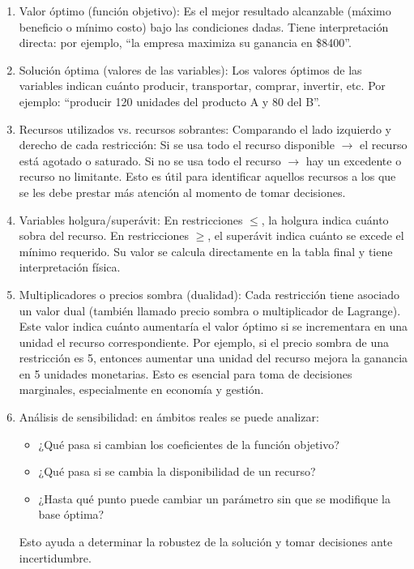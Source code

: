 \begin{enumerate}
  \item Valor óptimo (función objetivo): Es el mejor resultado alcanzable (máximo beneficio o mínimo costo) bajo las condiciones dadas. Tiene interpretación directa: por ejemplo, ``la empresa maximiza su ganancia en \$8400''.
  
  \item Solución óptima (valores de las variables): Los valores óptimos de las variables indican cuánto producir, transportar, comprar, invertir, etc. Por ejemplo: ``producir 120 unidades del producto A y 80 del B''.
  
  \item Recursos utilizados vs. recursos sobrantes: Comparando el lado izquierdo y derecho de cada restricción: Si se usa todo el recurso disponible \(\rightarrow\) el recurso está agotado o saturado. Si no se usa todo el recurso \(\rightarrow\) hay un excedente o recurso no limitante. Esto es útil para identificar aquellos recursos a los que se les debe prestar más atención al momento de tomar decisiones.
  
  \item Variables holgura/superávit: En restricciones \(\leq\), la holgura indica cuánto sobra del recurso. En restricciones \(\geq\), el superávit indica cuánto se excede el mínimo requerido. Su valor se calcula directamente en la tabla final y tiene interpretación física.
  
  \item Multiplicadores o precios sombra (dualidad): Cada restricción tiene asociado un valor dual (también llamado precio sombra o multiplicador de Lagrange). Este valor indica cuánto aumentaría el valor óptimo si se incrementara en una unidad el recurso correspondiente. Por ejemplo, si el precio sombra de una restricción es 5, entonces aumentar una unidad del recurso mejora la ganancia en 5 unidades monetarias. Esto es esencial para toma de decisiones marginales, especialmente en economía y gestión.
  
  \item Análisis de sensibilidad: en ámbitos reales se puede analizar:
  \begin{itemize}
    \item ¿Qué pasa si cambian los coeficientes de la función objetivo?
    \item ¿Qué pasa si se cambia la disponibilidad de un recurso?
    \item ¿Hasta qué punto puede cambiar un parámetro sin que se modifique la base óptima?
  \end{itemize}
  Esto ayuda a determinar la robustez de la solución y tomar decisiones ante incertidumbre.
\end{enumerate}

